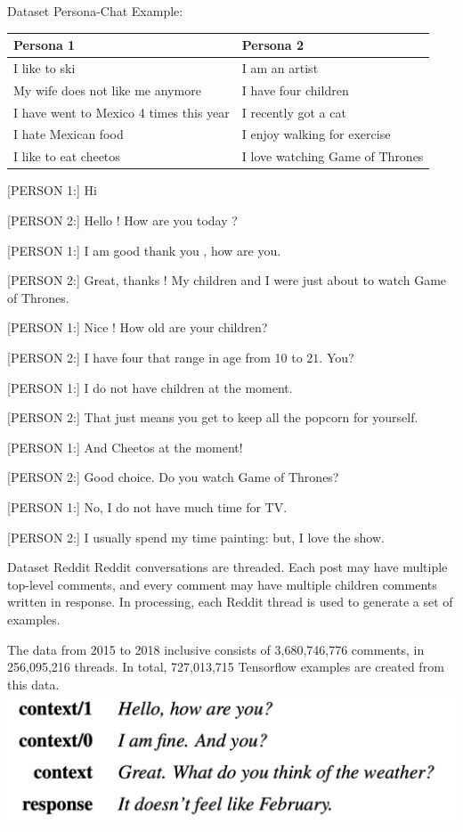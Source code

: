 \documentclass{beamer}
\begin{document}
\begin{frame}{Dataset Persona-Chat}
Example:
\begin{center}\tiny
\begin{tabular}{l|l}
\hline Persona 1 & Persona 2 \\
\hline I like to ski & I am an artist \\
My wife does not like me anymore & I have four children \\
I have went to Mexico 4 times this year & I recently got a cat \\
I hate Mexican food & I enjoy walking for exercise \\
I like to eat cheetos & I love watching Game of Thrones \\
\hline
\end{tabular}
\end{center}
\tiny
[PERSON 1:] Hi

[PERSON 2:] Hello ! How are you today ? 

[PERSON 1:] I am good thank you , how are you. 

[PERSON 2:] Great, thanks ! My children and I were just about to watch Game of Thrones. 

[PERSON 1:] Nice ! How old are your children? 

[PERSON 2:] I have four that range in age from 10 to $21 .$ You? 

[PERSON 1:] I do not have children at the moment. 

[PERSON 2:] That just means you get to keep all the popcorn for yourself. 

[PERSON 1:] And Cheetos at the moment! 

[PERSON 2:] Good choice. Do you watch Game of Thrones? 

[PERSON 1:] No, I do not have much time for TV. 

[PERSON 2:] I usually spend my time painting: but, I love the show.

\end{frame}

\begin{frame}{Dataset Reddit}
Reddit conversations are threaded. Each post may have multiple top-level comments, and every comment may have multiple children comments written in response. In processing, each Reddit thread is used to generate a set of examples. 

The data from 2015 to 2018 inclusive consists of
3,680,746,776 comments, in 256,095,216 threads.
In total, 727,013,715 Tensorflow examples are created from this data.
\includegraphics[width=0.5\linewidth]{reddit.png}
\end{frame}
\end{document}
